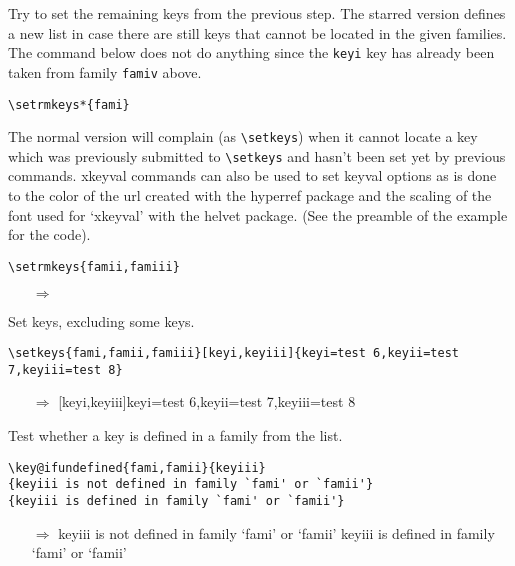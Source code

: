 \documentclass{article}
\begin{document}
Try to set the remaining keys from the previous step. The starred
version defines a new list in case there are still keys that
cannot be located in the given families. The command below does
not do anything since the \verb+keyi+ key has already been taken
from family \verb+famiv+ above.
\begin{verbatim}
\setrmkeys*{fami}
\end{verbatim}
\par

The normal version will complain (as \verb+\setkeys+) when it
cannot locate a key which was previously submitted to
\verb+\setkeys+ and hasn't been set yet by previous commands.
\textsf{xkeyval} commands can also be used to set \textsf{keyval}
options as is done to the color of the url created with the
\textsf{hyperref} package and the scaling of the font used for
`\textsf{xkeyval}' with the \textsf{helvet} package. (See the
preamble of the example for the code).
\begin{verbatim}
\setrmkeys{famii,famiii}
\end{verbatim}
\begin{itemize}
\item[$\Rightarrow$]
\end{itemize}

Set keys, excluding some keys.
\begin{verbatim}
\setkeys{fami,famii,famiii}[keyi,keyiii]{keyi=test 6,keyii=test 7,keyiii=test 8}
\end{verbatim}
\begin{itemize}
\item[$\Rightarrow$]
[keyi,keyiii]{keyi=test 6,keyii=test 7,keyiii=test 8}
\end{itemize}

Test whether a key is defined in a family from the list.
\begin{verbatim}
\key@ifundefined{fami,famii}{keyiii}
{keyiii is not defined in family `fami' or `famii'}
{keyiii is defined in family `fami' or `famii'}
\end{verbatim}
\begin{itemize}
\item[$\Rightarrow$]
{keyiii is not defined in family `fami' or `famii'}
{keyiii is defined in family `fami' or `famii'}
\end{itemize}
\end{document}
